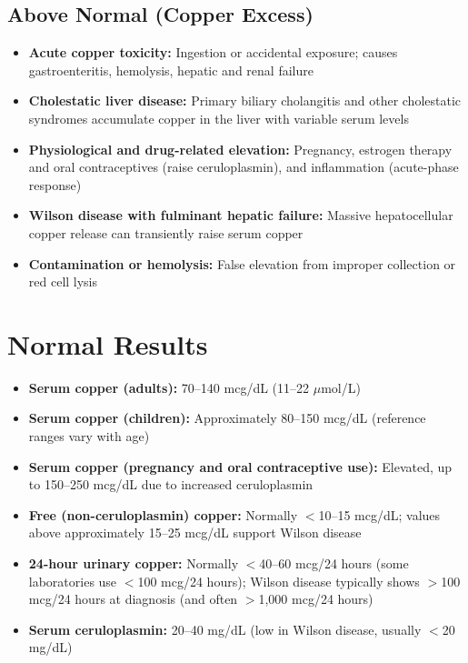 \subsection*{Above Normal (Copper Excess)}
\begin{itemize}
  \item \textbf{Acute copper toxicity:} Ingestion or accidental exposure; causes gastroenteritis, hemolysis, hepatic and renal failure
  \item \textbf{Cholestatic liver disease:} Primary biliary cholangitis and other cholestatic syndromes accumulate copper in the liver with variable serum levels
  \item \textbf{Physiological and drug-related elevation:} Pregnancy, estrogen therapy and oral contraceptives (raise ceruloplasmin), and inflammation (acute-phase response)
  \item \textbf{Wilson disease with fulminant hepatic failure:} Massive hepatocellular copper release can transiently raise serum copper
  \item \textbf{Contamination or hemolysis:} False elevation from improper collection or red cell lysis
\end{itemize}

\section*{Normal Results}
\begin{itemize}
  \item \textbf{Serum copper (adults):} 70--140 mcg/dL (11--22 $\mu$mol/L)
  \item \textbf{Serum copper (children):} Approximately 80--150 mcg/dL (reference ranges vary with age) \cite{fischbach2023manual}
  \item \textbf{Serum copper (pregnancy and oral contraceptive use):} Elevated, up to 150--250 mcg/dL due to increased ceruloplasmin
  \item \textbf{Free (non-ceruloplasmin) copper:} Normally $<$10--15 mcg/dL; values above approximately 15--25 mcg/dL support Wilson disease
  \item \textbf{24-hour urinary copper:} Normally $<$40--60 mcg/24 hours (some laboratories use $<$100 mcg/24 hours); Wilson disease typically shows $>$100 mcg/24 hours at diagnosis (and often $>$1,000 mcg/24 hours)
  \item \textbf{Serum ceruloplasmin:} 20--40 mg/dL (low in Wilson disease, usually $<$20 mg/dL)
\end{itemize}

